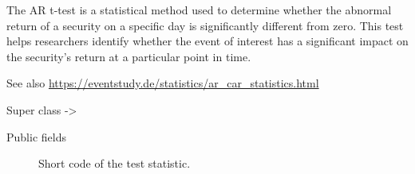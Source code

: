 \documentclass[a4paper]{book}
\begin{document}
%
\begin{Description}
The AR t-test is a statistical method used to determine whether the abnormal
return of a security on a specific day is significantly different from zero.
This test helps researchers identify whether the event of interest has a
significant impact on the security’s return at a particular point in time.

See also \url{https://eventstudy.de/statistics/ar_car_statistics.html}
\end{Description}
%
\begin{Section}{Super class}
 -> 
\end{Section}
%
\begin{Section}{Public fields}

\begin{description}

\item[] Short code of the test statistic.

\end{description}


\end{Section}
%
\end{document}
